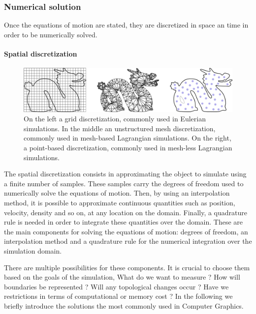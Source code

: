 \subsubsection{Numerical solution}

Once the equations of motion are stated, they are discretized in space an time in order to be numerically solved.

\paragraph{Spatial discretization}

\begin{figure}[!ht]
\centering
\includegraphics[scale=0.2]{images/continuum_mechanics/discretization.png}
\caption[STAR mechanics: Discretization]{\label{fig:discretization} On the left a grid discretization, commonly used in Eulerian simulations. In the middle an unstructured mesh discretization, commonly used in mesh-based Lagrangian simulations. On the right, a point-based discretization, commonly used in mesh-less Lagrangian simulations.}
\end{figure}

The spatial discretization consists in approximating the object to simulate using a finite number of samples. 
These samples carry the degrees of freedom used to numerically solve the equations of motion.
Then, by using an interpolation method, it is possible to approximate continuous quantities such as position, velocity, density and so on, at any location on the domain. 
Finally, a quadrature rule is needed in order to integrate these quantities over the domain. 
These are the main components for solving the equations of motion:
degrees of freedom, an interpolation method and a quadrature rule for the numerical integration over the simulation domain.

There are multiple possibilities for these components. It is crucial to choose them based on the goals of the simulation, What do we want to measure ? How will boundaries be represented ? Will any topological changes occur ? Have we restrictions in terms of computational or memory cost ? In the following we briefly introduce the solutions the most commonly used in Computer Graphics.

